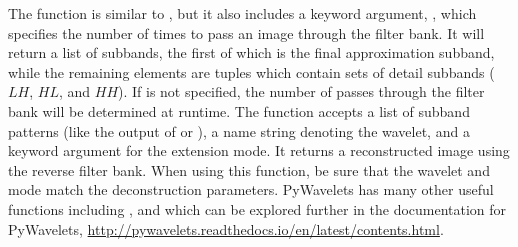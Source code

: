 The function  is similar to , but it also includes a keyword argument, , which specifies the number of times to pass an image through the filter bank.
It will return a list of subbands, the first of which is the final approximation subband, while the remaining elements are tuples which contain sets of detail subbands ($LH$, $HL$, and $HH$).
If  is not specified, the number of passes through the filter bank will be determined at runtime.
The function  accepts a list of subband patterns (like the output of  or ), a name string denoting the wavelet, and a keyword argument
 for the extension mode.
It returns a reconstructed image using the reverse filter bank.
When using this function, be sure that the wavelet and mode match the deconstruction parameters.
PyWavelets has many other useful functions including ,  and  which can be explored further in the documentation for PyWavelets, \url{http://pywavelets.readthedocs.io/en/latest/contents.html}.



\begin{comment} %
If this is included in the future, consider setting the coefficients of the final detail level to 0 instead of removing them from the reconstruction.
This gives similar results without reducing the size of the image.
\section*{Image Processing}
We are now ready to use the two-dimensional wavelet transform for image processing.
Wavelets are especially good at filtering out high-frequency noise from an image.
Just as we were able to pinpoint the noise added to the sine wave in Figure \ref{fig:dwt1D}, the majority of the noise added to an image will be contained in the final $LH$, $HL$, and $HH$ detail subbands of our wavelet decomposition.
If we decompose our image and reconstruct it with all subbands except these final subbands, we will eliminate most of the troublesome noise while preserving the primary aspects of the image.

We perform this cleaning as follows:
\begin{lstlisting}
image = imread(filename,True)
wavelet = pywt.Wavelet('haar')
WaveletCoeffs = pywt.wavedec2(image,wavelet)
new_image = pywt.waverec2(WaveletCoeffs[:-1], wavelet)
\end{lstlisting}

\begin{problem}
Write a function called \li{clean_image()} which accepts the name of a grayscale image file and cleans high-frequency noise out of the image.
Load the image as an ndarray, and perform a wavelet decomposition using PyWavelets.
Reconstruct the image using all subbands except the last set of detail coefficients, and return this cleaned image as an ndarray.
\end{problem}
\end{comment}


